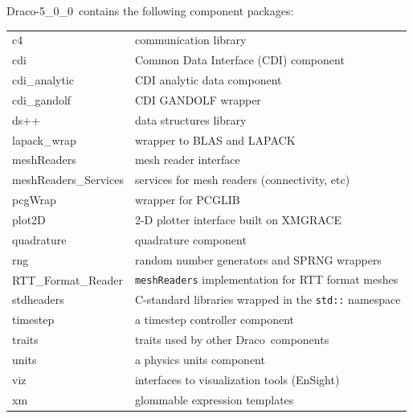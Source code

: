 \documentclass[note]{ResearchNote}
\newcommand{\draco}{Draco}
\newcommand{\dracor}{\draco-5\_0\_0}
\newcommand{\tableText}[1]{{\raggedright #1}}
\begin{document}
\dracor\ contains the following component packages:
\begin{center}
  \footnotesize
  \begin{tabular}{lp{3.0in}}
    \hline\hline 

    c4 & \tableText{communication library} \\
    cdi & \tableText{Common Data Interface (CDI) component} \\
    cdi\_analytic & \tableText{CDI analytic data component} \\
    cdi\_gandolf & \tableText{CDI GANDOLF wrapper} \\
    ds++ & \tableText{data structures library} \\
    lapack\_wrap & \tableText{wrapper to BLAS and LAPACK} \\
    meshReaders & \tableText{mesh reader interface} \\
    meshReaders\_Services & \tableText{services for mesh readers
      (connectivity, etc)} \\ 
    pcgWrap & \tableText{wrapper for PCGLIB} \\
    plot2D & \tableText{2-D plotter interface built on XMGRACE} \\
    quadrature & \tableText{quadrature component} \\
    rng & \tableText{random number generators and SPRNG wrappers} \\
    RTT\_Format\_Reader & \tableText{\texttt{meshReaders}
      implementation for RTT format meshes} \\
    stdheaders & \tableText{C-standard libraries wrapped in the
      \texttt{std::} namespace} \\ 
    timestep & \tableText{a timestep controller component} \\
    traits & \tableText{traits used by other \draco\ components} \\
    units & \tableText{a physics units component} \\
    viz & \tableText{interfaces to visualization tools (EnSight)} \\
    xm & \tableText{glommable expression templates} \\  

    \hline\hline 
  \end{tabular}
\end{center}
\end{document}
